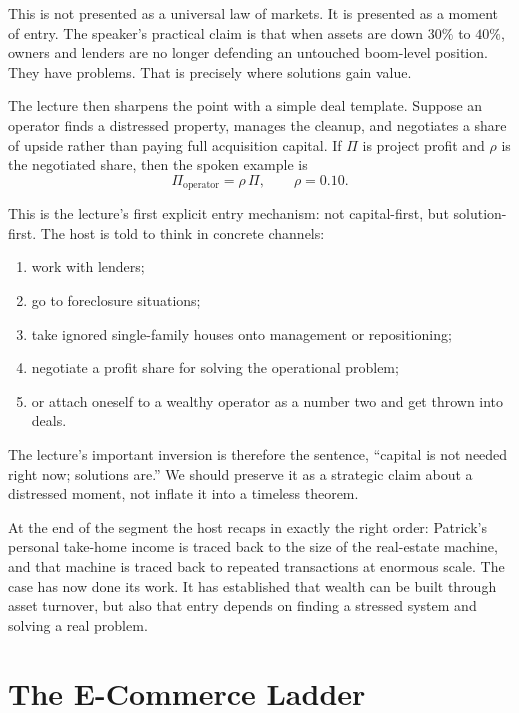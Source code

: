 This is not presented as a universal law of markets. It is presented as a moment of entry. The speaker's practical claim is that when assets are down \(30\%\) to \(40\%\), owners and lenders are no longer defending an untouched boom-level position. They have problems. That is precisely where solutions gain value.

The lecture then sharpens the point with a simple deal template. Suppose an operator finds a distressed property, manages the cleanup, and negotiates a share of upside rather than paying full acquisition capital. If \(\Pi\) is project profit and \(\rho\) is the negotiated share, then the spoken example is
\begin{equation}
\Pi_{\text{operator}} = \rho\,\Pi,\qquad \rho = 0.10.
\end{equation}

This is the lecture's first explicit entry mechanism: not capital-first, but solution-first. The host is told to think in concrete channels:
\begin{enumerate}
\item work with lenders;
\item go to foreclosure situations;
\item take ignored single-family houses onto management or repositioning;
\item negotiate a profit share for solving the operational problem;
\item or attach oneself to a wealthy operator as a number two and get thrown into deals.
\end{enumerate}

The lecture's important inversion is therefore the sentence, ``capital is not needed right now; solutions are.'' We should preserve it as a strategic claim about a distressed moment, not inflate it into a timeless theorem.

At the end of the segment the host recaps in exactly the right order: Patrick's personal take-home income is traced back to the size of the real-estate machine, and that machine is traced back to repeated transactions at enormous scale. The case has now done its work. It has established that wealth can be built through asset turnover, but also that entry depends on finding a stressed system and solving a real problem.

\section{The E-Commerce Ladder}

